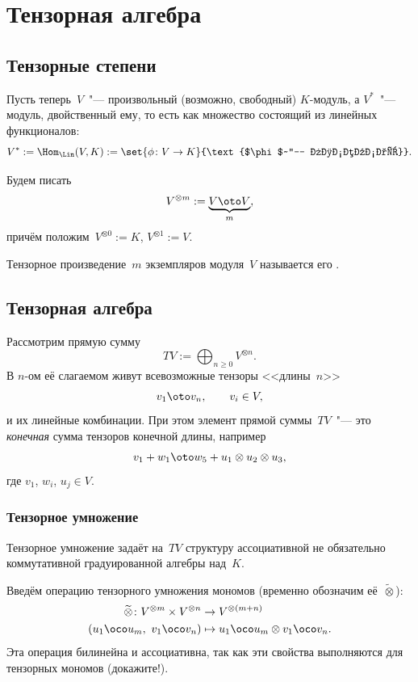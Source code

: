 \section{Тензорная алгебра}

\subsection{Тензорные степени}

Пусть теперь~$V$~"--- произвольный (возможно, свободный) $K$-модуль, а $V^*$~"--- модуль, двойственный ему, то есть как множество состоящий из линейных функционалов:
\[
	V^* :=
	\Hom_{\Lin}(V, K) :=
	\set{\phi \colon V \to K}{\text{$\phi$~"--- линейная}}
	.
\]

Будем писать
\[
	V^{\otimes m} :=
	\underbrace{V \oto V}_{m}
	,
\]
причём положим~$V^{\otimes 0} := K$, $V^{\otimes 1} := V$.

Тензорное произведение~$m$ экземпляров модуля~$V$ называется его .

\subsection{Тензорная алгебра}

Рассмотрим прямую сумму
\[
	TV :=
	\bigoplus_{n \geq 0}
	V^{\otimes n}
	.
\]
В $n$-ом её слагаемом живут всевозможные тензоры <<длины~$n$>>
\[
	v_1 \oto v_n,
	\qquad
	v_i \in V,
\]
и их линейные комбинации. При этом элемент прямой суммы~$TV$~"--- это \emph{конечная} сумма тензоров конечной длины, например
\[
	v_1 + w_1 \oto w_5 + u_1 \otimes u_2 \otimes u_3
	,
\]
где $v_1$, $w_i$, $u_j \in V$.

\subsubsection{Тензорное умножение}
Тензорное умножение задаёт на~$TV$ структуру ассоциативной не обязательно коммутативной градуированной алгебры над~$K$.

Введём операцию тензорного умножения мономов (временно обозначим её~$\widetilde{\otimes}$):
\begin{align*}
	\widetilde{\otimes} \colon
	V^{\otimes m}
	\times
	V^{\otimes n}
	&\to
	V^{\otimes (m + n)}
	\\
	(
		u_1 \oco u_m,\ 
		v_1 \oco v_n
	)
	&\mapsto
	u_1 \oco u_m
	\otimes
	v_1 \oco v_n
	.
\end{align*}
Эта операция билинейна и ассоциативна, так как эти свойства выполняются для тензорных мономов (докажите!).






